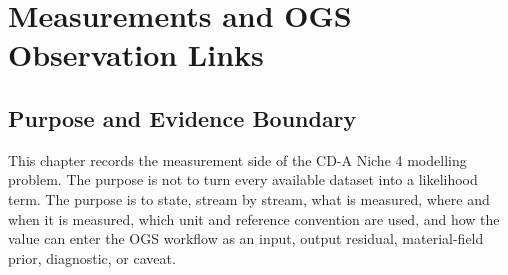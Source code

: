 \chapter{Measurements and OGS Observation Links}
\label{chap:measurements}

\newcommand{\gqStatus}[2]{\textcolor{#1}{\textbf{#2}}}
\newcommand{\gqPair}[4]{%
  \rowcolor{gqQuestionBg}%
  \multicolumn{2}{@{}L{0.94\textwidth}@{}}{\textbf{Question.} #3}\\*%
  \textbf{Answer.} & #4\\%
  \addlinespace[0.42em]%
}
\newcommand{\gqGroundingTable}[3]{%
  \Needspace{14\baselineskip}%
  \begin{center}%
  \footnotesize%
  \renewcommand{\arraystretch}{1.16}%
  \setlength{\tabcolsep}{4pt}%
  \captionof{table}{#2}%
  \label{#1}%
  \begin{tabular}{@{}L{0.17\textwidth} L{0.77\textwidth}@{}}%
  \toprule%
  #3%
  \bottomrule%
  \end{tabular}%
  \end{center}%
}

\section{Purpose and Evidence Boundary}
\label{sec:measurement-purpose}

This chapter records the measurement side of the CD-A Niche 4 modelling problem.
The purpose is not to turn every available dataset into a likelihood term.  The
purpose is to state, stream by stream, what is measured, where and when it is
measured, which unit and reference convention are used, and how the value can enter
the OGS workflow as an input, output residual, material-field prior, diagnostic, or
caveat.

